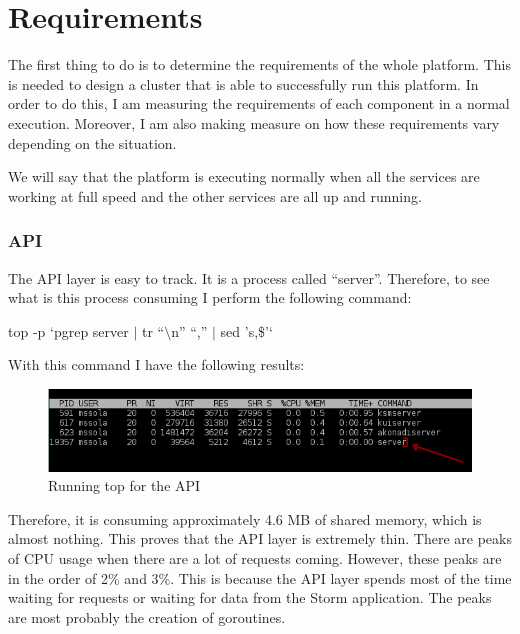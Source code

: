 
\section{Requirements}
\label{sec:requirements}

The first thing to do is to determine the requirements of the whole platform.
This is needed to design a cluster that is able to successfully run this
platform. In order to do this, I am measuring the requirements of each
component in a normal execution. Moreover, I am also making measure on how
these requirements vary depending on the situation.

We will say that the platform is executing normally when all the services are
working at full speed and the other services are all up and running.

\subsubsection*{API}

The API layer is easy to track. It is a process called ``server''. Therefore,
to see what is this process consuming I perform the following command:

\begin{center}

top -p `pgrep server $|$ tr ``$\setminus$n'' ``,'' $|$ sed 's\/,\$\/\/'`

\end{center}

With this command I have the following results:

\begin{figure}[H]
  \centering
  \includegraphics[scale=0.8]{hardware/images/api.png}
  \caption{Running top for the API}\label{fig:top_api}
\end{figure}

Therefore, it is consuming approximately 4.6 MB of shared memory, which is
almost nothing. This proves that the API layer is extremely thin. There are
peaks of CPU usage when there are a lot of requests coming. However, these
peaks are in the order of 2\% and 3\%. This is because the API layer spends
most of the time waiting for requests or waiting for data from the Storm
application. The peaks are most probably the creation of goroutines.

